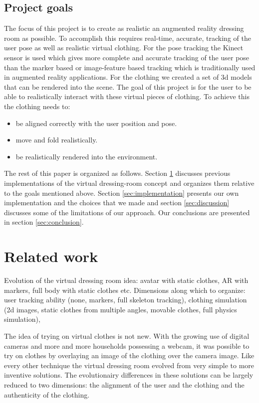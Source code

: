\documentclass[a4paper]{article}
\begin{document}

\subsection{Project goals}
\label{sec:project_goals}

The focus of this project is to create as realistic an augmented reality dressing room as possible. To accomplish this requires real-time, accurate, tracking of the user pose as well as realistic virtual clothing. For the pose tracking the Kinect sensor is used which gives more complete and accurate tracking of the user pose than the marker based or image-feature based tracking which is traditionally used in augmented reality applications. For the clothing we created a set of 3d models that can be rendered into the scene. The goal of this project is for the user to be able to realistically interact with these virtual pieces of clothing. To achieve this the clothing needs to:
\begin{itemize}
\item be aligned correctly with the user position and pose.
\item move and fold realistically. 
\item be realistically rendered into the environment.
\end{itemize}

The rest of this paper is organized as follows. Section \ref{sec:related_work} discusses previous implementations of the virtual dressing-room concept and organizes them relative to the goals mentioned above. Section \ref{sec:implementation} presents our own implementation and the choices that we made and section \ref{sec:discussion} discusses some of the limitations of our approach. Our conclusions are presented in section \ref{sec:conclusion}.


\section{Related work}
\label{sec:related_work}

Evolution of the virtual dressing room idea: avatar with static clothes, AR with markers, full body with static clothes etc. Dimensions along which to organize: user tracking ability (none, markers, full skeleton tracking), clothing simulation (2d images, static clothes from multiple angles, movable clothes, full physics simulation),

The idea of trying on virtual clothes is not new. With the growing use of digital cameras and more and more households possessing a webcam, it was possible to try on clothes by overlaying an image of the clothing over the camera image. Like every other technique the virtual dressing room evolved from very simple to more inventive solutions. The evolutionairy differences in these solutions can be largely reduced to two dimensions: the alignment of the user and the clothing and the authenticity of the clothing.
\end{document}
